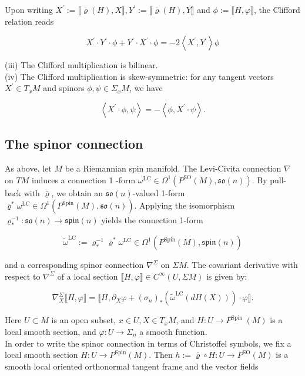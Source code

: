 \documentclass[10pt, letterpaper]{article}
\begin{document}
Upon writing $X^{\prime}:=\llbracket \bar{\varrho}(H), X \rrbracket, Y^{\prime}:=\llbracket \bar{\varrho}(H), Y \rrbracket$ and $\phi:=\llbracket H, \varphi \rrbracket$, the Clifford relation reads

$$
X^{\prime} \cdot Y^{\prime} \cdot \phi+Y^{\prime} \cdot X^{\prime} \cdot \phi=-2\left\langle X^{\prime}, Y^{\prime}\right\rangle \phi
$$

(iii) The Clifford multiplication is bilinear.\\
(iv) The Clifford multiplication is skew-symmetric: for any tangent vectors $X^{\prime} \in T_{x} M$ and spinors $\phi, \psi \in \Sigma_{x} M$, we have

$$
\left\langle X^{\prime} \cdot \phi, \psi\right\rangle=-\left\langle\phi, X^{\prime} \cdot \psi\right\rangle .
$$


\pagebreak
\subsection{The spinor connection}

As above, let $M$ be a Riemannian spin manifold. The Levi-Civita connection $\nabla$ on $T M$ induces a connection 1 -form $\omega^{\mathrm{LC}} \in \Omega^{1}\left(P^{\mathrm{SO}}(M), \mathfrak{s o}(n)\right)$. By pull-back with $\bar{\varrho}$, we obtain an $\mathfrak{s o}(n)$-valued 1-form $\bar{\varrho}^{*} \omega^{\mathrm{LC}} \in \Omega^{1}\left(P^{\operatorname{Spin}}(M), \mathfrak{s o}(n)\right)$. Applying the isomorphism $\varrho_{*}^{-1}: \mathfrak{s o}(n) \rightarrow \mathfrak{s p i n}(n)$ yields the connection 1-form

$$
\widetilde{\omega}^{\mathrm{LC}}:=\varrho_{*}^{-1} \bar{\varrho}^{*} \omega^{\mathrm{LC}} \in \Omega^{1}\left(P^{\mathrm{Spin}}(M), \mathfrak{s p i n}(n)\right)
$$

and a corresponding spinor connection $\nabla^{\Sigma}$ on $\Sigma M$. The covariant derivative with respect to $\nabla^{\Sigma}$ of a local section $\llbracket H, \varphi \rrbracket \in C^{\infty}(U, \Sigma M)$ is given by:

$$
\nabla_{X}^{\Sigma} \llbracket H, \varphi \rrbracket=\llbracket H, \partial_{X} \varphi+\left(\sigma_{n}\right)_{*}\left(\widetilde{\omega}^{\mathrm{LC}}(d H(X))\right) \cdot \varphi \rrbracket .
$$

Here $U \subset M$ is an open subset, $x \in U, X \in T_{x} M$, and $H: U \rightarrow P^{\text {Spin }}(M)$ is a local smooth section, and $\varphi: U \rightarrow \Sigma_{n}$ a smooth function.\\
In order to write the spinor connection in terms of Christoffel symbols, we fix a local smooth section $H: U \rightarrow P^{\mathrm{Spin}}(M)$. Then $h:=\bar{\varrho} \circ H: U \rightarrow P^{\mathrm{SO}}(M)$ is a smooth local oriented orthonormal tangent frame and the vector fields
\end{document}
